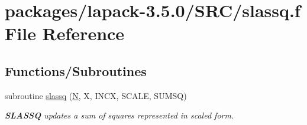 \hypertarget{slassq_8f}{}\section{packages/lapack-\/3.5.0/\+S\+R\+C/slassq.f File Reference}
\label{slassq_8f}
\subsection*{Functions/\+Subroutines}
\begin{DoxyCompactItemize}
\item 
subroutine \hyperlink{group__auxOTHERauxiliary_gaf079526ad6de4de7424528ec61b52629}{slassq} (\hyperlink{polmisc_8c_a0240ac851181b84ac374872dc5434ee4}{N}, X, I\+N\+C\+X, S\+C\+A\+L\+E, S\+U\+M\+S\+Q)
\begin{DoxyCompactList}\small\item\em {\bfseries S\+L\+A\+S\+S\+Q} updates a sum of squares represented in scaled form. \end{DoxyCompactList}\end{DoxyCompactItemize}
